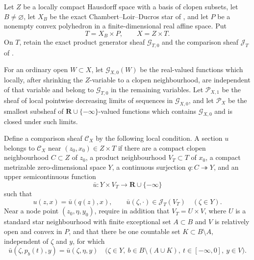 
\begin{theorem}
\label{thm:p071-stone-infinite-star-polyhedral-collapse}
Let $Z$ be a locally compact Hausdorff space with a basis of clopen
subsets, let $B\ne\varnothing$, let $X_B$ be the exact
Chambert--Loir--Ducros star of
, and let $P$ be a
nonempty convex polyhedron in a finite-dimensional real affine space.
Put
\[
                         T=X_B\times P,
             \qquad      X=Z\times T.
\]
On $T$, retain the exact product generator sheaf $\mathcal G_{T,0}$ and
the comparison sheaf $\mathcal J_T$ of
.

For an ordinary open $W\subset X$, let $\mathcal G_{X,0}(W)$ be the
real-valued functions which locally, after shrinking the $Z$-variable to
a clopen neighbourhood, are independent of that variable and belong to
$\mathcal G_{T,0}$ in the remaining variables.  Let $\mathcal P_{X,1}$
be the sheaf of local pointwise decreasing limits of sequences in
$\mathcal G_{X,0}$, and let $\mathcal P_X$ be the smallest subsheaf of
$\mathbf R\cup\{-\infty\}$-valued functions which contains
$\mathcal G_{X,0}$ and is closed under such limits.

Define a comparison sheaf $\mathcal C_X$ by the following local
condition.  A section $u$ belongs to $\mathcal C_X$ near
$(z_0,x_0)\in Z\times T$ if there are a compact clopen neighbourhood
$C\subset Z$ of $z_0$, a product neighbourhood $V_T\subset T$ of
$x_0$, a compact metrizable zero-dimensional space $Y$, a continuous
surjection $q:C\twoheadrightarrow Y$, and an upper semicontinuous function
\[
 \bar u:Y\times V_T\longrightarrow\mathbf R\cup\{-\infty\}
\]
such that
\begin{equation}
 u(z,x)=\bar u(q(z),x),
 \qquad
 \bar u(\zeta,\cdot)\in\mathcal J_T(V_T)
 \quad(\zeta\in Y).
 \label{eq:p071-stone-infinite-polyhedral-factorization}
\end{equation}
Near a node point $(z_0,\eta,y_0)$, require in addition that
$V_T=U\times V$, where $U$ is a standard star neighbourhood with finite
exceptional set $A\subset B$ and $V$ is relatively open and convex in
$P$, and that there be one countable set $K\subset B\setminus A$,
independent of $\zeta$ and $y$, for which
\begin{equation}
 \bar u(\zeta,p_b(t),y)=\bar u(\zeta,\eta,y)
 \quad
 \bigl(\zeta\in Y,\ b\in B\setminus(A\cup K),\
       t\in[-\infty,0],\ y\in V\bigr).
 \label{eq:p071-stone-infinite-polyhedral-common-activity}
\end{equation}


\end{theorem}
